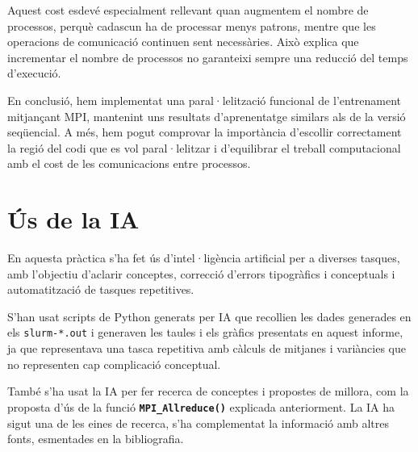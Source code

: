\documentclass{article}
\begin{document}
Aquest cost esdevé especialment rellevant quan augmentem el nombre de processos, perquè cadascun ha de processar menys patrons, mentre que les operacions de comunicació continuen sent necessàries. Això explica que incrementar el nombre de processos no garanteixi sempre una reducció del temps d'execució.

En conclusió, hem implementat una paral·lelització funcional de l'entrenament mitjançant MPI, mantenint uns resultats d'aprenentatge similars als de la versió seqüencial. A més, hem pogut comprovar la importància d'escollir correctament la regió del codi que es vol paral·lelitzar i d'equilibrar el treball computacional amb el cost de les comunicacions entre processos.


\newpage
\section{Ús de la IA}

En aquesta pràctica s'ha fet ús d'intel·ligència artificial per a diverses tasques, amb l'objectiu d'aclarir conceptes, correcció d'errors tipogràfics i conceptuals i automatització de tasques repetitives.

S'han usat scripts de Python generats per IA que recollien les dades generades en els \texttt{slurm-*.out} i generaven les taules i els gràfics presentats en aquest informe, ja que representava una tasca repetitiva amb càlculs de mitjanes i variàncies que no representen cap complicació conceptual.

També s'ha usat la IA per fer recerca de conceptes i propostes de millora, com la proposta d'ús de la funció \texttt{\textbf{MPI\_Allreduce()}} explicada anteriorment. La IA ha sigut una de les eines de recerca, s'ha complementat la informació amb altres fonts, esmentades en la bibliografia.

\newpage
\nocite{mpi50}   %


\end{document}
